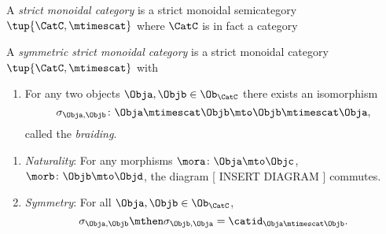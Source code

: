 {   
     \begin{ctdefinition}
        A \emph{strict monoidal category} is a strict monoidal semicategory $\tup{\CatC, \mtimescat}$ where $\CatC$ is in fact a category 
    \end{ctdefinition}

  \begin{ctdefinition}
        A \emph{symmetric strict monoidal category} is a strict monoidal category $\tup{\CatC, \mtimescat}$ with 
        
        \constit
        
        \begin{enumerate}
        \item For any two objects $\Obja, \Objb \in \Ob_\CatC$ there exists an isomorphism 
        \begin{equation}
        \sigma_{\Obja, \Objb} \colon \Obja \mtimescat   \Objb \mto \Objb \mtimescat   \Obja,
        \end{equation}
        called the \emph{braiding}.
        \end{enumerate}
        
        \condit
        
        \begin{enumerate} 
        \item \emph{Naturality}: For any morphisms $\mora \colon \Obja \mto \Objc$, $\morb \colon \Objb \mto \Objd$, the diagram 
        [ INSERT DIAGRAM ]
        commutes.
        \item \emph{Symmetry}: For all $\Obja, \Objb \in \Ob_\CatC$,
        \begin{equation}
        \sigma_{\Obja, \Objb} \mthen \sigma_{\Objb, \Obja} = \catid_{\Obja \mtimescat   \Objb}.
        \end{equation}
        \end{enumerate}
        
       
    \end{ctdefinition}

    
    

    
      

}
